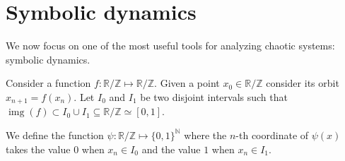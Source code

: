 \documentclass[12pt,a4paper]{report}
\theoremstyle{definition}
\begin{document}
\section{Symbolic dynamics}\label{sec:symbolic}

We now focus on one of the most useful tools for analyzing chaotic systems: symbolic dynamics.

Consider a function $f : \mathbb{R}/\mathbb{Z} \mapsto \mathbb{R}/\mathbb{Z}$. Given a point $x_0 \in  \mathbb{R}/\mathbb{Z}$ consider its orbit $x_{n+1} = f(x_n)$. Let $I_0$ and $I_1$ be two disjoint intervals such that $\operatorname{img}(f) \subset I_0 \cup I_1 \subseteq \mathbb{R}/\mathbb{Z} \simeq [0,1]$.

We define the function $\psi : \mathbb{R}/\mathbb{Z} \mapsto \{ 0,1\}^{\mathbb{N}}$ where the $n$-th coordinate of $\psi(x)$ takes the value $0$ when $x_n \in I_0$ and the value $1$ when $x_n \in I_1$.
\end{document}
